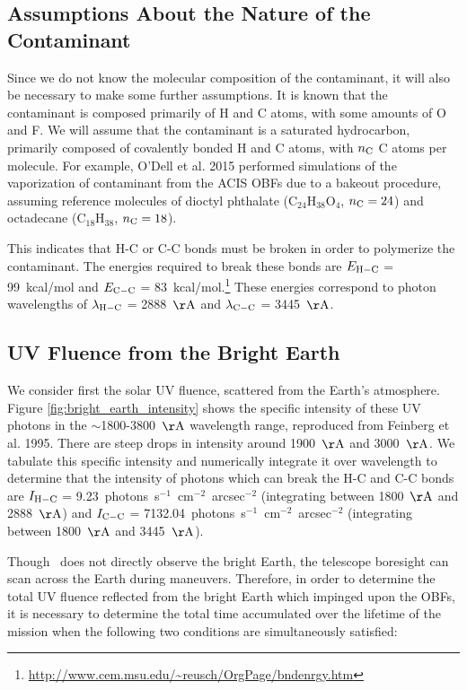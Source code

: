 \documentclass[11pt]{article}
\begin{document}
\subsection{Assumptions About the Nature of the Contaminant}

Since we do not know the molecular composition of the contaminant, it will also be necessary
to make some further assumptions. It is known that the contaminant is composed primarily of
H and C atoms, with some amounts of O and F. We will assume that the contaminant is a saturated
hydrocarbon, primarily composed of covalently bonded H and C atoms, with $n_{\rm C}$ C atoms
per molecule. For example, O'Dell et al. 2015 performed simulations of the vaporization of
contaminant from the ACIS OBFs due to a bakeout procedure, assuming reference molecules
of dioctyl phthalate (C$_{24}$H$_{38}$O$_4$, $n_{\rm C} = 24$) and octadecane (C$_{18}$H$_{38}$,
$n_{\rm C} = 18$).

This indicates that H-C or C-C bonds must be broken in order to polymerize the contaminant. The
energies required to break these bonds are $E_{\rm H-C}$ = 99~kcal/mol and $E_{\rm C-C}$ =
83~kcal/mol.\footnote{\url{http://www.cem.msu.edu/~reusch/OrgPage/bndenrgy.htm}} These energies
correspond to photon wavelengths of $\lambda_{\rm H-C}$ = 2888~${\rm \AA}$ and $\lambda_{\rm C-C}$
= 3445~${\rm \AA}$.

\subsection{UV Fluence from the Bright Earth}\label{sec:earth}

We consider first the solar UV fluence, scattered from the Earth's atmosphere. Figure
\ref{fig:bright_earth_intensity} shows the specific intensity of these UV photons in
the $\sim$1800-3800~${\rm \AA}$ wavelength range, reproduced from Feinberg et al. 1995. There
are steep drops in intensity around 1900~${\rm \AA}$ and 3000~${\rm \AA}$. We tabulate
this specific intensity and numerically integrate it over wavelength to determine that
the intensity of photons which can break the H-C and C-C bonds are $I_{\rm H-C}$ =
9.23~photons~s$^{-1}$~cm$^{-2}$~arcsec$^{-2}$ (integrating between 1800~${\rm \AA}$ and
2888~${\rm \AA}$) and $I_{\rm C-C}$ = 7132.04~photons~s$^{-1}$~cm$^{-2}$~arcsec$^{-2}$
(integrating between 1800~${\rm \AA}$ and 3445~${\rm \AA}$).

Though \chandra~does not directly observe the bright Earth, the telescope boresight can scan
across the Earth during maneuvers. Therefore, in order to determine the total UV fluence
reflected from the bright Earth which impinged upon the OBFs, it is necessary to determine
the total time accumulated over the lifetime of the mission when the following two conditions
are simultaneously satisfied:
\end{document}

